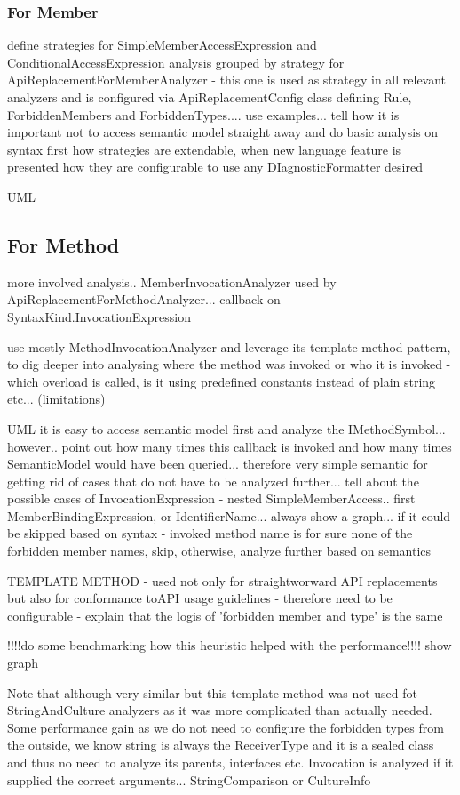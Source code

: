 \documentclass[
  digital, %
  table,   %
  lof,     %
  lot,     %
  oneside,
]{fithesis3}
\begin{document}
\subsubsection{For Member}
define strategies for SimpleMemberAccessExpression and ConditionalAccessExpression analysis grouped by strategy for ApiReplacementForMemberAnalyzer - this one is used as strategy in all relevant analyzers and is configured via ApiReplacementConfig class defining Rule, ForbiddenMembers and ForbiddenTypes.... use examples... tell how it is important not to access semantic model straight away and do basic analysis on syntax first
how strategies are extendable, when new language feature is presented
how they are configurable to use any DIagnosticFormatter desired

UML

\subsection{For Method}
more involved analysis.. MemberInvocationAnalyzer used by ApiReplacementForMethodAnalyzer... callback on SyntaxKind.InvocationExpression

use mostly MethodInvocationAnalyzer and leverage its template method pattern, to dig deeper into analysing where the method was invoked or who it is invoked - which overload is called, is it using predefined constants instead of plain string etc... (limitations)


UML 
it is easy to access semantic model first and analyze the IMethodSymbol... however.. point out how many times this callback is invoked and how many times SemanticModel would have been queried... therefore very simple semantic for getting rid of cases that do not have to be analyzed further... tell about the possible cases of InvocationExpression - nested SimpleMemberAccess.. first MemberBindingExpression, or IdentifierName... always show a graph...
if it could be skipped based on syntax - invoked method name is for sure none of the forbidden member names, skip, otherwise, analyze further based on semantics

TEMPLATE METHOD - used not only for straightworward API replacements but also for conformance toAPI usage guidelines - therefore need to be configurable - explain that the logis of 'forbidden member and type' is the same

!!!!do some benchmarking how this heuristic helped with the performance!!!! show graph

Note that although very similar but this template method was not used fot StringAndCulture analyzers as it was more complicated than actually needed. Some performance gain as we do not need to configure the forbidden types from the outside, we know string is always the ReceiverType and it is a sealed class and thus no need to analyze its parents, interfaces etc.
Invocation is analyzed if it supplied the correct arguments... StringComparison or CultureInfo
\end{document}
